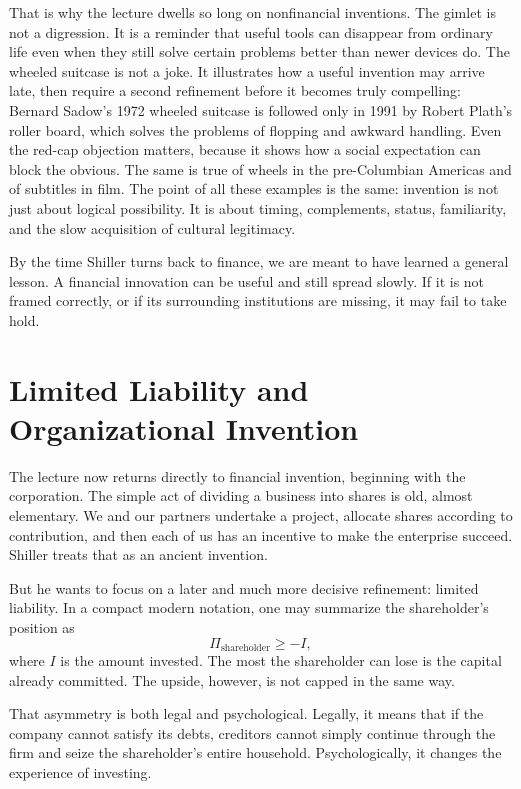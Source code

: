 That is why the lecture dwells so long on nonfinancial inventions. The gimlet is not a digression. It is a reminder that useful tools can disappear from ordinary life even when they still solve certain problems better than newer devices do. The wheeled suitcase is not a joke. It illustrates how a useful invention may arrive late, then require a second refinement before it becomes truly compelling: Bernard Sadow's 1972 wheeled suitcase is followed only in 1991 by Robert Plath's roller board, which solves the problems of flopping and awkward handling. Even the red-cap objection matters, because it shows how a social expectation can block the obvious. The same is true of wheels in the pre-Columbian Americas and of subtitles in film. The point of all these examples is the same: invention is not just about logical possibility. It is about timing, complements, status, familiarity, and the slow acquisition of cultural legitimacy.

By the time Shiller turns back to finance, we are meant to have learned a general lesson. A financial innovation can be useful and still spread slowly. If it is not framed correctly, or if its surrounding institutions are missing, it may fail to take hold.

\section{Limited Liability and Organizational Invention}

The lecture now returns directly to financial invention, beginning with the corporation. The simple act of dividing a business into shares is old, almost elementary. We and our partners undertake a project, allocate shares according to contribution, and then each of us has an incentive to make the enterprise succeed. Shiller treats that as an ancient invention.

But he wants to focus on a later and much more decisive refinement: limited liability. In a compact modern notation, one may summarize the shareholder's position as
\begin{equation}
\Pi_{\text{shareholder}} \ge -I,
\end{equation}
where $I$ is the amount invested. The most the shareholder can lose is the capital already committed. The upside, however, is not capped in the same way.

That asymmetry is both legal and psychological. Legally, it means that if the company cannot satisfy its debts, creditors cannot simply continue through the firm and seize the shareholder's entire household. Psychologically, it changes the experience of investing.

